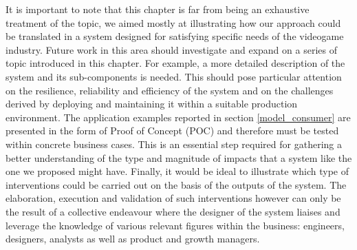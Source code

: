 It is important to note that this chapter is far from being an exhaustive treatment of the topic, we aimed mostly at illustrating how our approach could be translated in a system designed for satisfying specific needs of the videogame industry. Future work in this area should investigate and expand on a series of topic introduced in this chapter. For example, a more detailed description of the system and its sub-components is needed. This should pose particular attention on the resilience, reliability and efficiency of the system and on the challenges derived by deploying and maintaining it within a suitable production environment. The application examples reported in section \ref{model_consumer} are presented in the form of Proof of Concept (POC) and therefore must be tested within concrete business cases. This is an essential step required for gathering a better understanding of the type and magnitude of impacts that a system like the one we proposed might have. Finally, it would be ideal to illustrate which type of interventions could be carried out on the basis of the outputs of the system. The elaboration, execution and validation of such interventions however can only be the result of a collective endeavour where the designer of the system liaises and leverage the knowledge of various relevant figures within the business: engineers, designers, analysts as well as product and growth managers.


